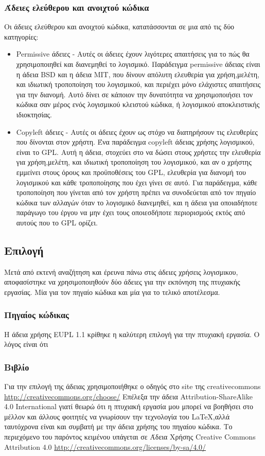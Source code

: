 \subsubsection{Άδειες ελεύθερου και ανοιχτού κώδικα}
Οι άδειες ελεύθερου και ανοιχτού κώδικα, κατατάσσονται σε μια από τις δύο κατηγορίες: 
\begin{itemize}
\item Permissive άδειες - Αυτές οι άδειες έχουν λιγότερες απαιτήσεις για το πώς θα χρησιμοποιηθεί και διανεμηθεί το λογισμικό. Παράδειγμα permissive άδειας είναι η άδεια BSD και η άδεια MIT, που δίνουν απόλυτη ελευθερία για χρήση,μελέτη, και ιδιωτική τροποποίηση του λογισμικού, και περιέχει μόνο ελάχιστες απαιτήσεις για την διανομή. Αυτό δίνει σε κάποιον την δυνατότητα να χρησιμοποιήσει τον κώδικα σαν μέρος ενός λογισμικού κλειστού κώδικα, ή λογισμικού αποκλειστικής ιδιοκτησίας.
\item Copyleft άδειες - Αυτές οι άδειες έχουν ως στόχο να διατηρήσουν τις ελευθερίες που δίνονται στον χρήστη. Ένα παράδειγμα copyleft άδειας χρήσης λογισμικού, είναι το GPL. Αυτή η άδεια, στοχεύει στο να δώσει στους χρήστες την ελευθερία για χρήση,μελέτη, και ιδιωτική τροποποίηση του λογισμικού, και αν ο χρήστης εμμείνει στους όρους και προϋποθέσεις του GPL, ελευθερία για διανομή του λογισμικού και κάθε τροποποίησης που έχει γίνει σε αυτό. Για παράδειγμα, κάθε τροποποίηση που γίνεται από τον χρήστη πρέπει να συνοδεύεται από τον πηγαίο κώδικα των αλλαγών όταν το λογισμικό διανεμηθεί, και η άδεια για οποιαδήποτε παράγωγο του έργου να μην έχει τους οποιεσδήποτε περιορισμούς εκτός από αυτούς που το GPL ορίζει.
\end{itemize}
\subsection{Επιλογή}
Μετά από εκτενή αναζήτηση και έρευνα πάνω στις άδειες χρήσεις λογισμικου, αποφασίστηκε να χρησιμοποιηθούν δύο άδειες για την εκπόνηση της πτυχιακής εργασίας. Μία για τον πηγαίο κώδικα και μία για το τελικό αποτέλεσμα. 
\subsubsection{Πηγαίος κώδικας}
Η άδεια χρήσης EUPL 1.1 κρίθηκε η καλύτερη επιλογή για την πτυχιακή εργασία. Ο λόγος είναι ότι

\subsubsection{Βιβλίο}
Για την επιλογή της άδειας χρησιμοποιήθηκε ο οδηγός στο site της creativecommons \url{http://creativecommons.org/choose/}
Επέλεξα την άδεια Attribution-ShareAlike 4.0 International \ccbysa γιατί θεωρώ ότι η πτυχιακή εργασία μου μπορεί να βοηθήσει στο μέλλον και άλλους φοιτητές να γνωρίσουν την τεχνολογία του \LaTeX ,αλλά ταυτόχρονα είναι και συμβατή με την άδεια χρήσης του πηγαίου κώδικα.
\vfill
Το περιεχόμενο του παρόντος κειμένου υπάγεται σε Άδεια Χρήσης Creative Commons Attribution 4.0 \url{http://creativecommons.org/licenses/by-sa/4.0/}